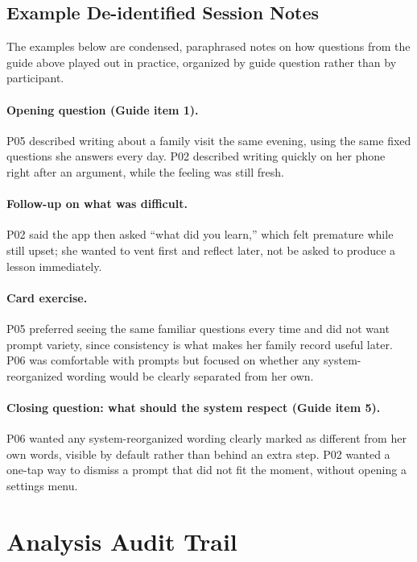 \documentclass[sigconf,nonacm]{acmart}
\begin{document}
\subsection{Example De-identified Session Notes}

The examples below are condensed, paraphrased notes on how questions from
the guide above played out in practice, organized by guide question rather
than by participant.

\paragraph{Opening question (Guide item 1).} P05 described writing about a
family visit the same evening, using the same fixed questions she answers
every day. P02 described writing quickly on her phone right after an
argument, while the feeling was still fresh.

\paragraph{Follow-up on what was difficult.} P02 said the app then asked
``what did you learn,'' which felt premature while still upset; she wanted to
vent first and reflect later, not be asked to produce a lesson immediately.

\paragraph{Card exercise.} P05 preferred seeing the same familiar questions
every time and did not want prompt variety, since consistency is what makes
her family record useful later. P06 was comfortable with prompts but focused
on whether any system-reorganized wording would be clearly separated from her
own.

\paragraph{Closing question: what should the system respect (Guide item 5).}
P06 wanted any system-reorganized wording clearly marked as different from
her own words, visible by default rather than behind an extra step. P02
wanted a one-tap way to dismiss a prompt that did not fit the moment, without
opening a settings menu.

\section{Analysis Audit Trail}
\label{app:audit}
\end{document}
